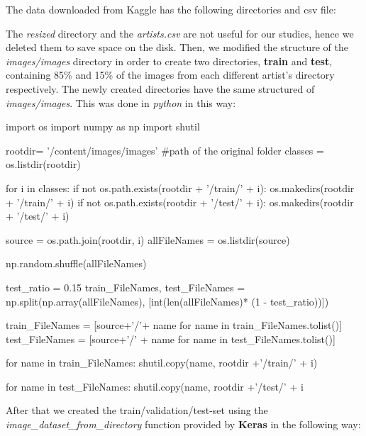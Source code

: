 \noindent The data downloaded from Kaggle has the following directories and csv file:

\noindent The \textit{resized} directory and the \textit{artists.csv} are not useful for our studies, hence we deleted them to save space on the disk. Then, we modified the structure of the \textit{images/images} directory in order to create two directories, \textbf{train} and \textbf{test}, containing 85\% and 15\% of the images from each different artist's directory respectively. The newly created directories have the same structured of \textit{images/images}. This was done in \textit{python} in this way:

\begin{python}
import os
import numpy as np
import shutil

rootdir= '/content/images/images' #path of the original folder
classes = os.listdir(rootdir)

for i in classes:
  if not os.path.exists(rootdir + '/train/' + i):
    os.makedirs(rootdir + '/train/' + i)
  if not os.path.exists(rootdir + '/test/' + i):  
    os.makedirs(rootdir + '/test/' + i)

  source = os.path.join(rootdir, i)
  allFileNames = os.listdir(source)

  np.random.shuffle(allFileNames)

  test_ratio = 0.15
  train_FileNames, test_FileNames = np.split(np.array(allFileNames),
                                                        [int(len(allFileNames)* (1 - test_ratio))])

  train_FileNames = [source+'/'+ name for name in train_FileNames.tolist()]
  test_FileNames = [source+'/' + name for name in test_FileNames.tolist()]

  for name in train_FileNames:
    shutil.copy(name, rootdir +'/train/' + i)

  for name in test_FileNames:
    shutil.copy(name, rootdir +'/test/' + i
\end{python}

After that we created the train/validation/test-set using the \textit{image\_dataset\_from\_directory} function provided by \textbf{Keras} in the following way:

